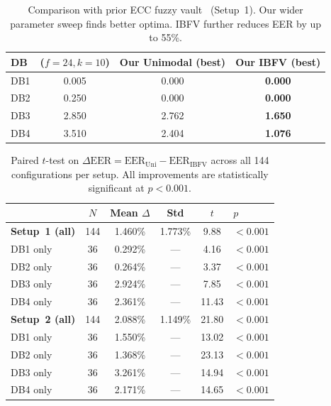 \begin{table}[t]
\centering
\caption{Comparison with prior ECC fuzzy vault~\cite{senior2025} (Setup~1).
Our wider parameter sweep finds better optima. IBFV further reduces EER by up to 55\%.}
\label{tab:comparison}
\begin{tabular}{lccc}
\toprule
DB & \cite{senior2025} ($f\!=\!24, k\!=\!10$) & Our Unimodal (best) & \textbf{Our IBFV (best)} \\
\midrule
DB1 & 0.005 & 0.000 & \textbf{0.000} \\
DB2 & 0.250 & 0.000 & \textbf{0.000} \\
DB3 & 2.850 & 2.762 & \textbf{1.650} \\
DB4 & 3.510 & 2.404 & \textbf{1.076} \\
\bottomrule
\end{tabular}
\end{table}

\begin{table}[t]
\centering
\caption{Paired $t$-test on $\Delta\mathrm{EER} = \mathrm{EER}_\mathrm{Uni} - \mathrm{EER}_\mathrm{IBFV}$ across all 144 configurations per setup.
All improvements are statistically significant at $p < 0.001$.}
\label{tab:stats}
\begin{tabular}{lccccl}
\toprule
 & $N$ & Mean $\Delta$ & Std & $t$ & $p$ \\
\midrule
\textbf{Setup~1 (all)} & 144 & 1.460\% & 1.773\% & 9.88 & $<0.001$ \\
\quad DB1 only & 36 & 0.292\% & — & 4.16 & $<0.001$ \\
\quad DB2 only & 36 & 0.264\% & — & 3.37 & $<0.001$ \\
\quad DB3 only & 36 & 2.924\% & — & 7.85 & $<0.001$ \\
\quad DB4 only & 36 & 2.361\% & — & 11.43 & $<0.001$ \\
\midrule
\textbf{Setup~2 (all)} & 144 & 2.088\% & 1.149\% & 21.80 & $<0.001$ \\
\quad DB1 only & 36 & 1.550\% & — & 13.02 & $<0.001$ \\
\quad DB2 only & 36 & 1.368\% & — & 23.13 & $<0.001$ \\
\quad DB3 only & 36 & 3.261\% & — & 14.94 & $<0.001$ \\
\quad DB4 only & 36 & 2.171\% & — & 14.65 & $<0.001$ \\
\bottomrule
\end{tabular}
\end{table}

